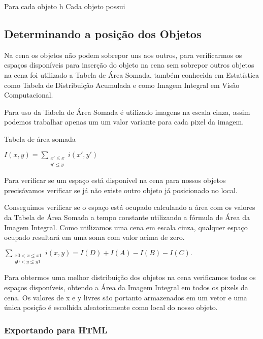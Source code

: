 \documentclass[12pt]{article}
\begin{document}
Para cada objeto h
Cada objeto possui



\subsection{Determinando a posição dos Objetos}

Na cena os objetos não podem sobrepor uns aos outros, para verificarmos os espaços disponíveis para inserção do objeto na cena sem sobrepor outros objetos na cena foi utilizado a Tabela de Área Somada, também conhecida em Estatística como Tabela de Distribuição Acumulada e como Imagem Integral em Visão Computacional.

Para uso da Tabela de Área Somada é utilizado imagens na escala cinza, assim podemos trabalhar apenas um um valor variante para cada pixel da imagem. 

Tabela de área somada


$I(x,y) = \sum_{\begin{smallmatrix} x' \le x \\ y' \le y\end{smallmatrix}} i(x',y')$

Para verificar se um espaço está disponível na cena para nossos objetos precisávamos verificar se já não existe outro objeto já posicionado no local. 

Conseguimos verificar se o espaço está ocupado calculando a área com os valores da Tabela de Área Somada a tempo constante utilizando a fórmula de Área da Imagem Integral. Como utilizamos uma cena em escala cinza, qualquer espaço ocupado resultará em uma soma com valor acima de zero.  

$\sum_{\begin{smallmatrix} x0 < x \le x1 \\ y0 < y \le y1 \end{smallmatrix}} i(x,y) = I(D) + I(A) - I(B) - I(C).$

Para obtermos uma melhor distribuição dos objetos na cena verificamos todos os espaços disponíveis, obtendo a Área da Imagem Integral em todos os pixels da cena. Os valores de x e y livres são portanto armazenados em um vetor e uma única posição é escolhida aleatoriamente como local do nosso objeto. 


\subsubsection{Exportando para HTML}
\end{document}
